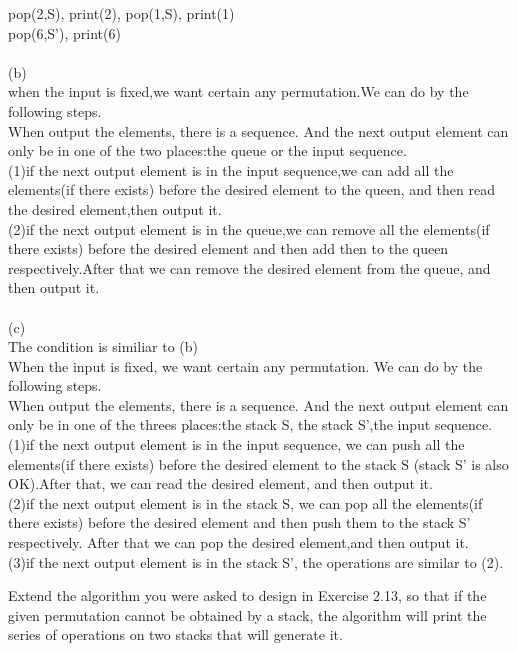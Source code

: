 \documentclass[11pt, a4paper, UTF8]{ctexart}
\begin{document}
\begin{solution}
pop(2,S), print(2), pop(1,S), print(1)\\
pop(6,S'), print(6)\\
\\
(b)\\
when the input is fixed,we want certain any permutation.We can do by the following steps.\\
When output the elements, there is a sequence. And the next output element can only be in one of the two places:the queue or the input sequence.\\
(1)if the next output element is in the input sequence,we can add all the elements(if there exists) before the desired element to the queen, and then read the desired element,then output it.\\
(2)if the next output element is in the queue,we can remove all the elements(if there exists) before the desired element and then add then to the queen respectively.After that we can remove the desired element from the queue, and then output it.\\
\\
(c)\\
The condition is similiar to (b)\\
When the input is fixed, we want certain any permutation. We can do by the following steps.\\
When output the elements, there is a sequence. And the next output element can only be in one of the threes places:the stack S, the stack S',the input sequence.\\
(1)if the next output element is in the input sequence, we can push all the elements(if there exists) before the desired element to the stack S (stack S' is also OK).After that, we can read the desired element, and then output it.\\
(2)if the next output element is in the stack S, we can pop all the elements(if there exists) before the desired element and then push them to the stack S' respectively. After that we can pop the desired element,and then output it.\\
(3)if the next output element is in the stack S', the operations are similar to (2).
\end{solution}

\begin{problem}[DH: 2.15]
Extend the algorithm you were asked to design in Exercise 2.13, so that if the given permutation cannot be obtained by a stack, the algorithm will print the series of operations on two stacks that will generate it.
\end{problem}
\end{document}
